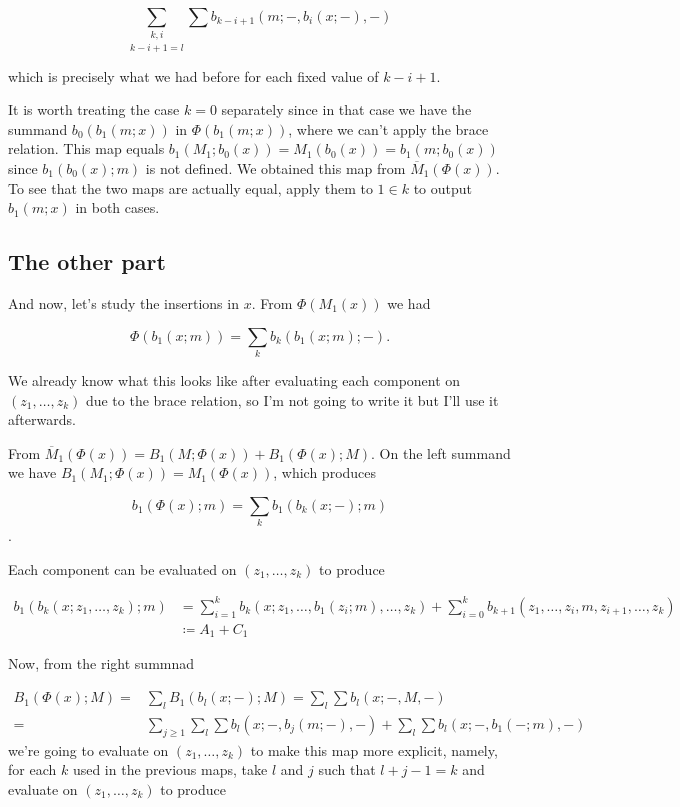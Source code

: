 \documentclass[twoside]{article}
\begin{document}
$$\underset{k-i+1=l}{\sum_{k,i}}\sum b_{k-i+1}(m;-,b_i(x;-),-)$$

which is precisely what we had before for each fixed value of $k-i+1$. %

It is worth treating the case $k=0$ separately since in that case we have the summand $b_0(b_1(m;x))$ in $\Phi(b_1(m;x))$, where we can't apply the brace relation. This map equals $b_1(M_1;b_0(x))=M_1(b_0(x))=b_1(m;b_0(x))$ since $b_1(b_0(x);m)$ is not defined. We obtained this map from $\overline{M}_1(\Phi(x))$. To see that the two maps are actually equal, apply them to $1\in k$ to output $b_1(m;x)$ in both cases. %

\subsection{The other part}

And now, let's study the insertions in $x$. From $\Phi(M_1(x))$ we had 

$$\Phi(b_1(x;m))=\sum_k b_k(b_1(x;m);-).$$

We already know what this looks like after evaluating each component on $(z_1,\dots, z_k)$ due to the brace relation, so I'm not going to write it but I'll use it afterwards. 

From $\overline{M}_1(\Phi(x))=B_1(M;\Phi(x))+B_1(\Phi(x);M)$.  On the left summand we have $B_1(M_1;\Phi(x))=M_1(\Phi(x))$, which produces 

$$b_1(\Phi(x);m)=\sum_k b_1(b_k(x;-);m)$$. 

Each component can be evaluated on $(z_1,\dots, z_k)$ to produce

\begin{align*}
b_1(b_k(x;z_1, \dots, z_k);m)&=\sum_{i=1}^k b_k(x;z_1,\dots, b_1(z_i;m),\dots, z_k)+\sum_{i=0}^k b_{k+1}(z_1,\dots, z_i,m,z_{i+1},\dots, z_k)\\
&\coloneqq A_1+C_1
\end{align*}

Now, from the right summnad 

\begin{align*}
B_1(\Phi(x);M)=&\sum_l B_1(b_l(x;-);M)=\sum_l\sum b_l(x;-,M,-) \\
=&\sum_{j\geq 1} \sum_l\sum b_l(x;-,b_j(m;-),-)+\sum_l\sum b_l(x;-,b_1(-;m),-)
\end{align*}
 we're going to evaluate on $(z_1,\dots, z_k)$ to make this map more explicit, namely, for each $k$ used in the previous maps, take $l$ and $j$ such that $l+j-1=k$ and evaluate on $(z_1,\dots, z_k)$ to produce
 
\end{document}
